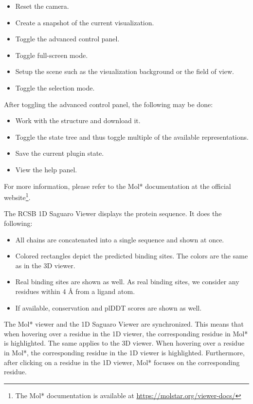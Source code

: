 \begin{itemize}
    \item Reset the camera.
    \item Create a snapshot of the current visualization.
    \item Toggle the advanced control panel.
    \item Toggle full-screen mode.
    \item Setup the scene such as the visualization background or the field of view.
    \item Toggle the selection mode.
\end{itemize}

After toggling the advanced control panel, the following may be done:

\begin{itemize}
    \item Work with the structure and download it.
    \item Toggle the state tree and thus toggle multiple of the available representations.
    \item Save the current plugin state.
    \item View the help panel.
\end{itemize}

For more information, please refer to the Mol* documentation at the official website\footnote{The Mol* documentation is available at \url{https://molstar.org/viewer-docs/}}.

The RCSB 1D Saguaro Viewer displays the protein sequence. It does the following:

\begin{itemize}
    \item All chains are concatenated into a single sequence and shown at once.
    \item Colored rectangles depict the predicted binding sites. The colors are the same as in the 3D viewer.
    \item Real binding sites are shown as well. As real binding sites, we consider any residues within 4 \AA{} from a ligand atom.
    \item If available, conservation and plDDT scores are shown as well.
\end{itemize}

The Mol* viewer and the 1D Saguaro Viewer are synchronized. This means that when hovering over a residue in the 1D viewer, the corresponding residue in Mol* is highlighted. The same applies to the 3D viewer. When hovering over a residue in Mol*, the corresponding residue in the 1D viewer is highlighted. Furthermore, after clicking on a residue in the 1D viewer, Mol* focuses on the corresponding residue.

